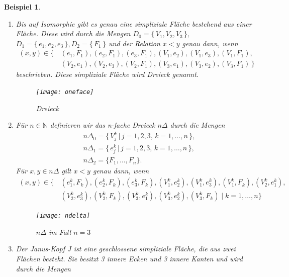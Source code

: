 \documentclass[12pt,titlepage,twoside,cleardoublepage]{article}
\theoremstyle{nummermitklammern}
\newtheorem{bsp}[temp]{Beispiel}
\newtheorem{bsp}[zahl]{Beispiel}
\numberwithin{equation}{section}
\begin{document}
 \begin{bsp}\label{bspsimp}
 \begin{enumerate}
\item 
 Bis auf Isomorphie gibt es genau eine simpliziale Fläche bestehend aus einer Fläche. Diese wird durch die Mengen $
D_{0}=\{\,V_{1},V_{2},V_{3}\,\},$  $D_{1}=\{\,e_{1},e_{2},e_{3}\,\}, D_{2}=\{\,F_{1}\,\}$  und der Relation $x<y$ genau dann, wenn
\begin{align*}
 (x,y)\in \{\,&(e_{1},F_{1}),(e_{2},F_{1}),(e_{3},F_{1}),(V_{1},e_{2}),(V_{1},e_{3}),(V_{1},F_{1}),\\ &(V_{2},e_{1}), (V_{2},e_{3}),(V_{2},F_{1}),
 (V_{3},e_{1}),(V_{3},e_{2}),(V_{3},F_{1})\,\} 
\end{align*} 
beschrieben. Diese simpliziale Fläche wird \emph{Dreieck} genannt. 
\begin{figure}[H]
\begin{center}
\texttt{[image: oneface]}
\end{center}
\caption{Dreieck}
\end{figure}
 \item
 Für $n \in \mathbb{N}$ definieren wir das \emph{n-fache Dreieck} $n \Delta$ durch die Mengen 
 \begin{align*}
  &n\Delta_0=\{ \,V_{j}^{k}\,\vert\, j=1,2,3,\,k=1,\ldots,n\,\},\\
   &n\Delta_1=\{\,e_{j}^{k}\,\vert\, j=1,2,3,\,k=1,\ldots,n\,\},\\
   &n\Delta_2=\{F_{1},\ldots,F_{n}\} .
   \end{align*}
   Für $x,y\in n\Delta$ gilt $x<y$ genau dann, wenn
   \begin{align*}
 (x,y)\in \{\,&(e_{1}^k,F_{k}),(e_{2}^k,F_{k}),(e_{3}^k,F_{k}),(V_{1}^k,e_{2}^k),(V_{1}^k,e_{3}^k),(V_{1}^k,F_{k}), (V_{2}^k,e_{1}^k),\\ &(V_{2}^k,e_{3}^k),(V_{2}^k,F_{k}),(V_{3}^k,e_{1}^k),(V_{3}^k,e_{2}^k),(V_{3}^k,F_{k})\mid k=1,\ldots,n\} 
\end{align*}
 \begin{figure}[H]
\begin{center}
\texttt{[image: ndelta]}
\end{center}
\caption{$n\Delta$ im Fall $n=3$}
\end{figure}
 \item 
 Der \emph{Janus-Kopf} $J$ ist eine geschlossene simpliziale Fläche, die aus zwei Flächen besteht. Sie besitzt 3 innere Ecken und 3 innere Kanten und wird durch die Mengen

\end{enumerate}
\end{bsp}
\end{document}
